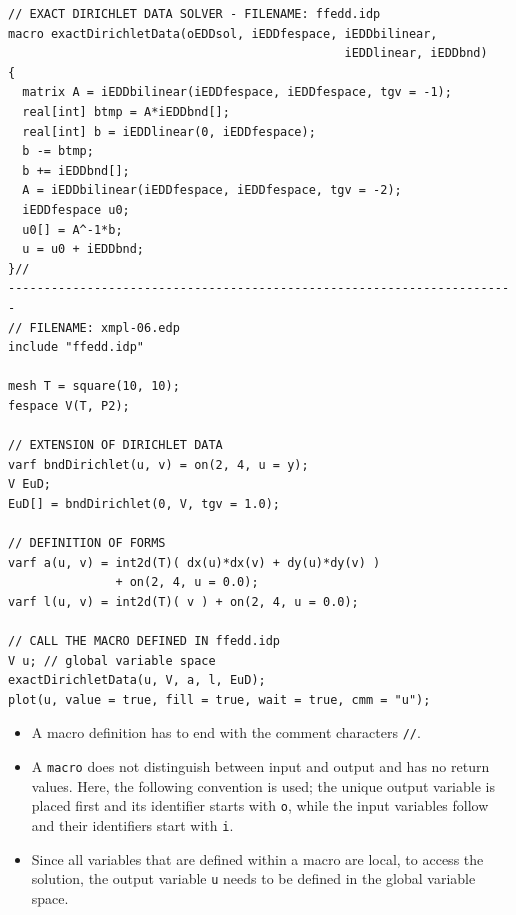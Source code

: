 \documentclass[9pt]{amsart}
\theoremstyle{remark}
\theoremstyle{definition}
\begin{document}
\begin{Verbatim}
// EXACT DIRICHLET DATA SOLVER - FILENAME: ffedd.idp
macro exactDirichletData(oEDDsol, iEDDfespace, iEDDbilinear,
                                               iEDDlinear, iEDDbnd)
{
  matrix A = iEDDbilinear(iEDDfespace, iEDDfespace, tgv = -1);
  real[int] btmp = A*iEDDbnd[];
  real[int] b = iEDDlinear(0, iEDDfespace);
  b -= btmp;
  b += iEDDbnd[];
  A = iEDDbilinear(iEDDfespace, iEDDfespace, tgv = -2);
  iEDDfespace u0;
  u0[] = A^-1*b;
  u = u0 + iEDDbnd;
}//
-----------------------------------------------------------------------
// FILENAME: xmpl-06.edp
include "ffedd.idp"

mesh T = square(10, 10);
fespace V(T, P2);

// EXTENSION OF DIRICHLET DATA
varf bndDirichlet(u, v) = on(2, 4, u = y);
V EuD;
EuD[] = bndDirichlet(0, V, tgv = 1.0);

// DEFINITION OF FORMS
varf a(u, v) = int2d(T)( dx(u)*dx(v) + dy(u)*dy(v) )
               + on(2, 4, u = 0.0);
varf l(u, v) = int2d(T)( v ) + on(2, 4, u = 0.0);

// CALL THE MACRO DEFINED IN ffedd.idp
V u; // global variable space
exactDirichletData(u, V, a, l, EuD);
plot(u, value = true, fill = true, wait = true, cmm = "u");
\end{Verbatim}
\begin{itemize}
\item A macro definition has to end with the comment characters \verb!//!.
\item A \verb!macro! does not distinguish between input and output and has no return values. Here, the following convention is used; the unique output variable is placed first and its identifier starts with \verb!o!, while the input variables follow and their identifiers start with \verb!i!.
\item Since all variables that are defined within a macro are local, to access the solution, the output variable \verb!u! needs to be defined in the global variable space.
\end{itemize}
\end{document}
